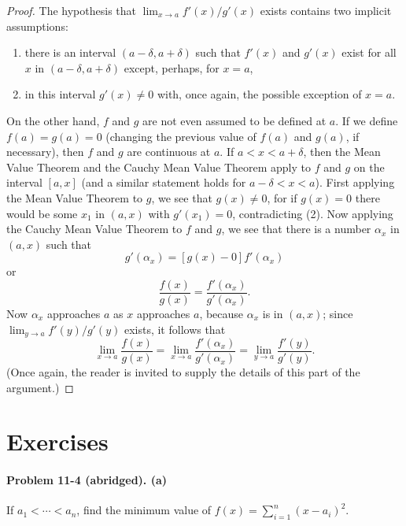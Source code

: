 \documentclass{article}
\begin{document}
\begin{proof}
  The hypothesis that $\lim_{x \rightarrow a} f'(x)/g'(x)$ exists contains two
  implicit assumptions: \begin{enumerate}
    \item there is an interval $(a - \delta, a + \delta)$ such that $f'(x)$ and
      $g'(x)$ exist for all $x$ in $(a - \delta, a + \delta)$ except, perhaps,
      for $x = a$,
    \item in this interval $g'(x) \neq 0$ with, once again, the possible
      exception of $x = a$.
  \end{enumerate} On the other hand, $f$ and $g$ are not even assumed to be
  defined at $a$. If we define $f(a) = g(a) = 0$ (changing the previous value
  of $f(a)$ and $g(a)$, if necessary), then $f$ and $g$ are continuous at $a$.
  If $a < x < a + \delta$, then the Mean Value Theorem and the Cauchy Mean
  Value Theorem apply to $f$ and $g$ on the interval $[a, x]$ (and a similar
  statement holds for $a - \delta < x < a$). First applying the Mean Value
  Theorem to $g$, we see that $g(x) \neq 0$, for if $g(x) = 0$ there would be
  some $x_1$ in $(a, x)$ with $g'(x_1) = 0$, contradicting (2). Now applying
  the Cauchy Mean Value Theorem to $f$ and $g$, we see that there is a number
  $\alpha_x$ in $(a, x)$ such that \begin{equation*}
    [f(x) - 0]g'(\alpha_x) = [g(x) - 0]f'(\alpha_x)
  \end{equation*} or \begin{equation*}
    \frac{f(x)}{g(x)} = \frac{f'(\alpha_x)}{g'(\alpha_x)}.
  \end{equation*} Now $\alpha_x$ approaches $a$ as $x$ approaches $a$, because
  $\alpha_x$ is in $(a, x)$; since $\lim_{y \rightarrow a} f'(y)/g'(y)$ exists,
  it follows that \begin{equation*}
    \lim_{x \rightarrow a} \frac{f(x)}{g(x)} = \lim_{x \rightarrow a}
      \frac{f'(\alpha_x)}{g'(\alpha_x)} = \lim_{y \rightarrow a}
      \frac{f'(y)}{g'(y)}.
  \end{equation*} (Once again, the reader is invited to supply the details of
  this part of the argument.)
\end{proof}

\section*{Exercises}

\paragraph{Problem 11-4 (abridged). (a)} If $a_1 < \cdots < a_n$, find the
minimum value of $f(x) = \sum_{i = 1}^n (x - a_i)^2$.
\end{document}

